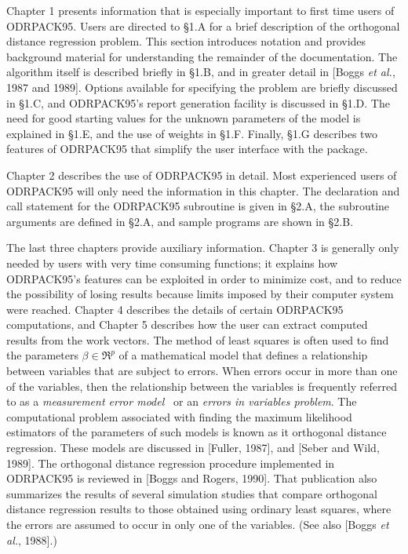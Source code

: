 \noindent Chapter 1 presents information that is especially important to first
time users of ODRPACK95. Users are directed to \S 1.A for a brief description of
the orthogonal distance regression problem. This section introduces notation and
provides background material for understanding the remainder of the
documentation. The algorithm itself is described briefly in \S 1.B, and in
greater detail in [Boggs {\it et al.}, 1987 and 1989]. Options available for
specifying the problem are briefly discussed in \S 1.C, and ODRPACK95's report
generation facility is discussed in \S 1.D. The need for good starting values
for the unknown parameters of the model is explained in \S 1.E, and the use of
weights in \S 1.F. Finally, \S 1.G describes two features of ODRPACK95 that simplify the user interface with the package.

\noindent Chapter 2 describes the use of ODRPACK95 in detail. Most
experienced users of ODRPACK95 will only need the information in this
chapter. The declaration and call statement for the ODRPACK95 subroutine
is given in \S 2.A, the subroutine arguments are defined in \S 2.A,
and sample programs are shown in \S 2.B.

\noindent The last three chapters provide auxiliary information. Chapter 3 is
generally only needed by users with very time consuming functions; it explains
how ODRPACK95's features can be exploited in order to minimize cost, and to
reduce the possibility of losing results because limits imposed by their
computer system were reached. Chapter 4 describes the details of certain
ODRPACK95 computations, and Chapter 5 describes how the user can extract computed results from the work vectors.
\bigskip
{}\medskip
\noindent The method of least squares is often used to find the parameters
$\beta\in\Re^p$ of a mathematical model that defines a relationship between
variables that are subject to errors. When errors occur in more than one of the
variables, then the relationship between the variables is frequently referred to
as a {\it measurement error model\ } or an {\it errors in variables problem}.
The computational problem associated with finding the maximum likelihood
estimators of the parameters of such models is known as {it orthogonal distance
regression}. These models are discussed in [Fuller, 1987], and [Seber and Wild,
1989]. The orthogonal distance regression procedure implemented in ODRPACK95 is reviewed in [Boggs and Rogers, 1990]. That publication also summarizes the results of several simulation studies that compare orthogonal distance regression results to those obtained using ordinary least squares, where the errors are assumed to occur in only one of the variables. (See also [Boggs {\it et al.}, 1988].)

